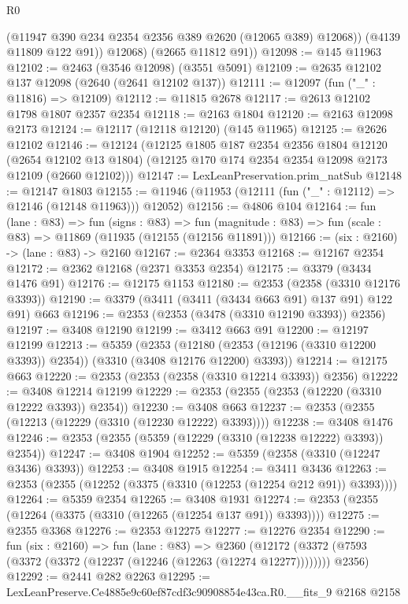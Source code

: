 \begin{lexlean}{R0}
\begin{coremodule}
            (@11947 @390 @234 @2354 @2356 @389 @2620 (@12065 @389) @12068))
          (@4139 @11809 @122 @91))
        @12068)
      (@2665 @11812 @91))
@12098 := @145 @11963
@12102 := @2463 (@3546 @12098) (@3551 @5091)
@12109 := @2635 @12102 @137 @12098 (@2640 (@2641 @12102 @137))
@12111 := @12097 (fun ("_" : @11816) => @12109)
@12112 := @11815 @2678
@12117 := @2613 @12102 @1798 @1807 @2357 @2354
@12118 := @2163 @1804
@12120 := @2163 @12098 @2173
@12124 := @12117 (@12118 @12120) (@145 @11965)
@12125 := @2626 @12102
@12146 := @12124
    (@12125
      @1805
      @187
      @2354
      @2356
      @1804
      @12120
      (@2654 @12102 @13 @1804)
      (@12125 @170 @174 @2354 @2354 @12098 @2173 @12109 (@2660 @12102)))
@12147 := LexLeanPreservation.prim_natSub
@12148 := @12147 @1803
@12155 := @11946 (@11953 (@12111 (fun ("_" : @12112) => @12146 (@12148 @11963))) @12052)
@12156 := @4806 @104
@12164 := fun (lane : @83) =>
  fun (signs : @83) =>
  fun (magnitude : @83) => fun (scale : @83) => @11869 (@11935 (@12155 (@12156 @11891)))
@12166 := (six : @2160) -> (lane : @83) -> @2160
@12167 := @2364 @3353
@12168 := @12167 @2354
@12172 := @2362 @12168 (@2371 @3353 @2354)
@12175 := @3379 (@3434 @1476 @91)
@12176 := @12175 @1153
@12180 := @2353 (@2358 (@3310 @12176 @3393))
@12190 := @3379 (@3411 (@3411 (@3434 @663 @91) @137 @91) @122 @91) @663
@12196 := @2353 (@2353 (@3478 (@3310 @12190 @3393)) @2356)
@12197 := @3408 @12190
@12199 := @3412 @663 @91
@12200 := @12197 @12199
@12213 := @5359
    (@2353 (@12180 (@2353 (@12196 (@3310 @12200 @3393)) @2354)) (@3310 (@3408 @12176 @12200) @3393))
@12214 := @12175 @663
@12220 := @2353 (@2353 (@2358 (@3310 @12214 @3393)) @2356)
@12222 := @3408 @12214 @12199
@12229 := @2353 (@2355 (@2353 (@12220 (@3310 @12222 @3393)) @2354))
@12230 := @3408 @663
@12237 := @2353 (@2355 (@12213 (@12229 (@3310 (@12230 @12222) @3393))))
@12238 := @3408 @1476
@12246 := @2353 (@2355 (@5359 (@12229 (@3310 (@12238 @12222) @3393)) @2354))
@12247 := @3408 @1904
@12252 := @5359 (@2358 (@3310 (@12247 @3436) @3393))
@12253 := @3408 @1915
@12254 := @3411 @3436
@12263 := @2353 (@2355 (@12252 (@3375 (@3310 (@12253 (@12254 @212 @91)) @3393))))
@12264 := @5359 @2354
@12265 := @3408 @1931
@12274 := @2353 (@2355 (@12264 (@3375 (@3310 (@12265 (@12254 @137 @91)) @3393))))
@12275 := @2355 @3368
@12276 := @2353 @12275
@12277 := @12276 @2354
@12290 := fun (six : @2160) =>
  fun (lane : @83) =>
  @2360 (@12172 (@3372 (@7593 (@3372 (@3372 (@12237 (@12246 (@12263 (@12274 @12277)))))))) @2356)
@12292 := @2441 @282 @2263
@12295 := LexLeanPreserve.Ce4885e9c60ef87cdf3c90908854e43ca.R0.__fits_9 @2168 @2158

\end{coremodule}
\end{lexlean}
